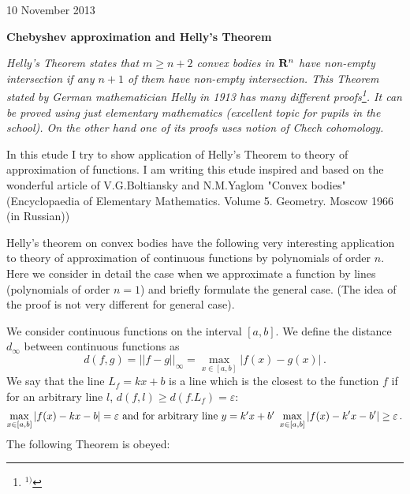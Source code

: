 
\def\p{\partial}
\def\t {\tilde}
\def \m {\medskip}
\def\degree {{\bf {\rm degree}\,\,}}
\def \finish {${\,\,\vrule height1mm depth2mm width 8pt}$}

\def\a {\alpha}
\def\vare{{\varepsilon}}
\def\l {\lambda}
\def\s {{\sigma}}

\def\G {{\Gamma}}

\def\A {{\bf A}}
\def\C {{\bf C}}
\def\E  {{\bf E}}
\def\K {{\bf K}}
\def\N {{\bf N}}
\def\Q {{\bf Q}}
\def\R  {{\bf R}}
\def\V {{\cal V}}
\def \X   {{\bf X}}
\def \Y   {{\bf Y}}
\def\Z {{\bf Z}}



\def\ac {{\bf a}}
\def\e{{\bf e}}
\def\f {{\bf f}}
\def\n {{\bf n}}
\def\r {{\bf r}}
\def\v {{\bf v}}
\def \x   {{\bf x}}
\def \y   {{\bf y}}


\def\pt {{\bf pt}}



10 November 2013


\centerline {\bf Chebyshev approximation and Helly's Theorem}

\m

  {\it  Helly's Theorem states that $m\geq n+2$ convex bodies in $\R^{n}$
 have non-empty intersection if any $n+1$ of them have non-empty intersection.
This Theorem stated by German mathematician Helly in 1913 has
many different proofs\footnote{$^{1)}$}.
It can be proved using just  elementary mathematics
(excellent topic for pupils in the school). On the other hand 
one of its proofs uses notion of Chech cohomology.

  In this etude I try to show application of Helly's Theorem
to theory of approximation of functions.
  I am writing this etude inspired and 
based on the wonderful article
of V.G.Boltiansky and N.M.Yaglom "Convex bodies"
(Encyclopaedia of Elementary Mathematics. Volume 5. Geometry. Moscow 1966
(in Russian)) 



}

Helly's theorem on convex bodies have the 
following very interesting application to theory of approximation
of continuous functions by polynomials of order $n$. Here we 
consider in detail the case when we approximate a function by lines
(polynomials of order $n=1$) and briefly formulate the general case.
(The idea of the proof is not very different for general case).

We consider continuous functions on the interval $[a,b]$. 
We define the distance $d_\infty$ between continuous functions as
            $$
    d(f,g)=||f-g||_\infty=\max_{x\in [a,b]}|f(x)-g(x)|\,.
            $$
  We say that the line $L_f=kx+b$ is a line which is the closest 
to the function $f$ if for an arbitrary line $l$,
  $d(f,l)\geq d(f.L_f)=\vare$:
           $$
\max_{x\in [a,b]}|f(x)-kx-b|=\vare\,\,
\hbox{and for arbitrary line $y=k'x+b'$}\,\,    
\max_{x\in [a,b]}|f(x)-k'x-b'|\geq\vare\,.
           $$
The following Theorem is obeyed:

